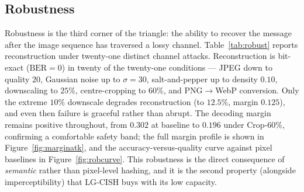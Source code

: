 \documentclass[11pt]{article}
\begin{document}
\subsection{Robustness}\label{sec:robustness}
Robustness is the third corner of the triangle: the ability to recover the message
after the image sequence has traversed a lossy channel. Table~\ref{tab:robust}
reports reconstruction under twenty-one distinct channel attacks. Reconstruction is
bit-exact ($\mathrm{BER}=0$) in twenty of the twenty-one conditions --- JPEG down to
quality $20$, Gaussian noise up to $\sigma{=}30$, salt-and-pepper up to density
$0.10$, downscaling to $25\%$, centre-cropping to $60\%$, and PNG$\to$WebP
conversion. Only the extreme $10\%$ downscale degrades reconstruction (to $12.5\%$,
margin $0.125$), and even then failure is graceful rather than abrupt. The decoding
margin remains positive throughout, from $0.302$ at baseline to $0.196$ under
Crop-$60\%$, confirming a comfortable safety band; the full margin profile is shown
in Figure~\ref{fig:marginatk}, and the accuracy-versus-quality curve against
pixel baselines in Figure~\ref{fig:robcurve}. This robustness is the direct
consequence of \emph{semantic} rather than pixel-level hashing, and it is the second
property (alongside imperceptibility) that LG-CISH buys with its low capacity.
\end{document}
